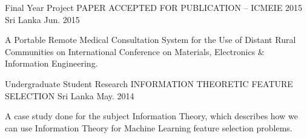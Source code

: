 


\begin{cventries}


    \cventry
        {Final Year Project} %
        {PAPER ACCEPTED FOR PUBLICATION – ICMEIE 2015} %
        {Sri Lanka} %
        {Jun. 2015} %
        { %
            \begin{cvitems}
                \item {A Portable Remote Medical Consultation System for the Use of Distant Rural Communities on International Conference on Materials, Electronics \& Information Engineering.}
            \end{cvitems}
        }


    \cventry
        {Undergraduate Student Research} %
        {INFORMATION THEORETIC FEATURE SELECTION} %
        {Sri Lanka} %
        {May. 2014} %
        { %
            \begin{cvitems}
                \item {A case study done for the subject Information Theory, which describes how we can use Information Theory for Machine Learning feature selection problems.}
            \end{cvitems}
        }


\end{cventries}